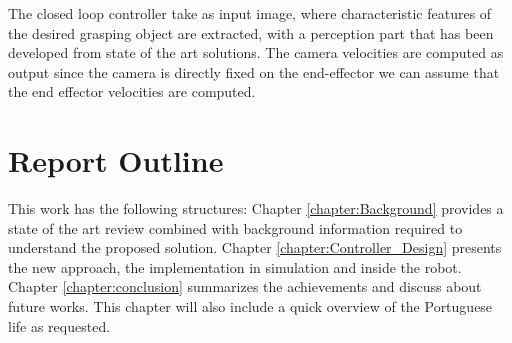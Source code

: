 The closed loop controller take as input image, where characteristic features of the desired grasping object are extracted, with a perception part that has been developed from state of the art solutions. The camera velocities are computed as output since the camera is directly fixed on the end-effector we can assume that the end effector velocities are computed. 


\section{Report Outline}

This work has the following structures: Chapter \ref{chapter:Background} provides a state of the art review combined with background information required to understand the proposed solution. Chapter \ref{chapter:Controller_Design} presents the new approach, the implementation in simulation and inside the robot. Chapter \ref{chapter:conclusion} summarizes the achievements and discuss about future works. This chapter will also include a quick overview of the Portuguese life as requested. 
